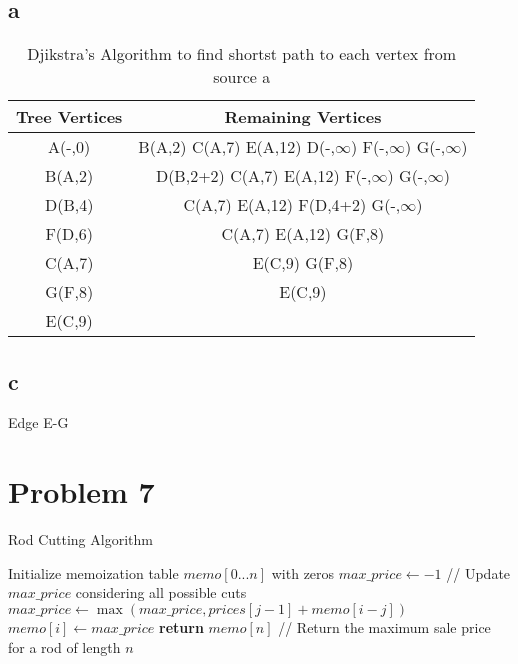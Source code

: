 \documentclass{article}
\begin{document}
\subsection*{a}
\begin{table}[ht]
    \centering
    \begin{tabular}{|c|c|}
        \hline
        \textbf{Tree Vertices} & \textbf{Remaining Vertices}                                     \\
        \hline
        A(-,0)                 & B(A,2) C(A,7) E(A,12) D(-,$\infty$) F(-,$\infty$) G(-,$\infty$) \\
        \hline
        B(A,2)                 & D(B,2+2) C(A,7) E(A,12) F(-,$\infty$) G(-,$\infty$)             \\
        \hline
        D(B,4)                 & C(A,7) E(A,12) F(D,4+2) G(-,$\infty$)                           \\
        \hline
        F(D,6)                 & C(A,7) E(A,12) G(F,8)                                           \\
        \hline
        C(A,7)                 & E(C,9) G(F,8)                                                   \\
        \hline
        G(F,8)                 & E(C,9)                                                          \\
        \hline
        E(C,9)                 &                                                                 \\
        \hline
    \end{tabular}
    \caption{Djikstra's Algorithm to find shortst path to each vertex from source a}
    \label{tab:table6}
\end{table}

\subsection*{c} Edge E-G

\newpage
\section*{Problem 7}
\begin{algorithm}
    \caption{Rod Cutting Algorithm}
    \begin{algorithmic}[1]
        \State Initialize memoization table $memo[0...n]$ with zeros
        \State $max\_price \gets -1$
        \State // Update $max\_price$ considering all possible cuts
        \State $max\_price \gets \max(max\_price, prices[j - 1] + memo[i - j])$
        \EndFor
        \State $memo[i] \gets max\_price$
        \EndFor
        \State \textbf{return} $memo[n]$  // Return the maximum sale price for a rod of length $n$
        \EndProcedure
    \end{algorithmic}
\end{algorithm}
\end{document}
